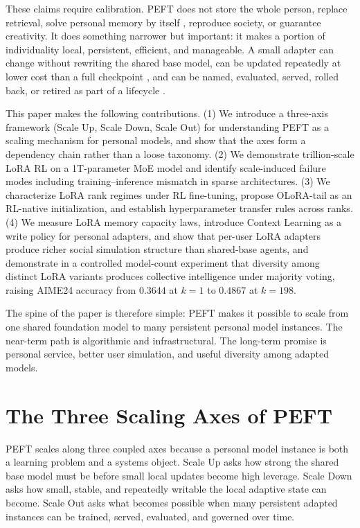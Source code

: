 \documentclass{llmxive}
\providecommand{\pony}[1]{#1}
\begin{document}
\pony{These claims require calibration. PEFT does not store the whole person, replace retrieval, solve personal memory by itself \citep{packer2024memgpt}, reproduce society, or guarantee creativity. It does something narrower but important: it makes a portion of individuality local, persistent, efficient, and manageable. A small adapter can change without rewriting the shared base model, can be updated repeatedly at lower cost than a full checkpoint \citep{biderman2024loraforgets}, and can be named, evaluated, served, rolled back, or retired as part of a lifecycle \citep{mindlab2026mint}.}

\pony{This paper makes the following contributions. (1) We introduce a three-axis framework (Scale Up, Scale Down, Scale Out) for understanding PEFT as a scaling mechanism for personal models, and show that the axes form a dependency chain rather than a loose taxonomy. (2) We demonstrate trillion-scale LoRA RL on a 1T-parameter MoE model and identify scale-induced failure modes including training--inference mismatch in sparse architectures. (3) We characterize LoRA rank regimes under RL fine-tuning, propose OLoRA-tail as an RL-native initialization, and establish hyperparameter transfer rules across ranks. (4) We measure LoRA memory capacity laws, introduce Context Learning as a write policy for personal adapters, and show that per-user LoRA adapters produce richer social simulation structure than shared-base agents, and demonstrate in a controlled model-count experiment that diversity among distinct LoRA variants produces collective intelligence under majority voting, raising AIME24 accuracy from $0.3644$ at $k=1$ to $0.4867$ at $k=198$.}

\pony{The spine of the paper is therefore simple: PEFT makes it possible to scale from one shared foundation model to many persistent personal model instances. The near-term path is algorithmic and infrastructural. The long-term promise is personal service, better user simulation, and useful diversity among adapted models.}


\section{The Three Scaling Axes of PEFT}\label{sec:three-axes}

\pony{PEFT scales along three coupled axes because a personal model instance is both a learning problem and a systems object. Scale Up asks how strong the shared base model must be before small local updates become high leverage. Scale Down asks how small, stable, and repeatedly writable the local adaptive state can become. Scale Out asks what becomes possible when many persistent adapted instances can be trained, served, evaluated, and governed over time.}
\end{document}
